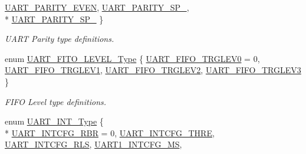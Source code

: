 \begin{DoxyCompactItemize}
\hyperlink{group___u_a_r_t___public___types_gga66fa9d836eb6f7035939427e6f8cc318ad908a637b1dd23f93b149dd2d8bdfdb8}{U\+A\+R\+T\+\_\+\+P\+A\+R\+I\+T\+Y\+\_\+\+E\+V\+EN}, 
\hyperlink{group___u_a_r_t___public___types_gga66fa9d836eb6f7035939427e6f8cc318ae9f804cb1d440a3a890fd7617450d2a1}{U\+A\+R\+T\+\_\+\+P\+A\+R\+I\+T\+Y\+\_\+\+S\+P\+\_}, 
\\*
\hyperlink{group___u_a_r_t___public___types_gga66fa9d836eb6f7035939427e6f8cc318a7b7ef44908952b2188985f07f81420f6}{U\+A\+R\+T\+\_\+\+P\+A\+R\+I\+T\+Y\+\_\+\+S\+P\+\_}
 \}\begin{DoxyCompactList}\small\item\em U\+A\+RT Parity type definitions. \end{DoxyCompactList}
\item 
enum \hyperlink{group___u_a_r_t___public___types_gad85d4333c1c346b3078d4abe95d4b2f7}{U\+A\+R\+T\+\_\+\+F\+I\+T\+O\+\_\+\+L\+E\+V\+E\+L\+\_\+\+Type} \{ \hyperlink{group___u_a_r_t___public___types_ggad85d4333c1c346b3078d4abe95d4b2f7a31c04a9c2880b330633c41a16014a9d5}{U\+A\+R\+T\+\_\+\+F\+I\+F\+O\+\_\+\+T\+R\+G\+L\+E\+V0} = 0, 
\hyperlink{group___u_a_r_t___public___types_ggad85d4333c1c346b3078d4abe95d4b2f7aea4c7e4f74b82f0bd9b442d8c1d03809}{U\+A\+R\+T\+\_\+\+F\+I\+F\+O\+\_\+\+T\+R\+G\+L\+E\+V1}, 
\hyperlink{group___u_a_r_t___public___types_ggad85d4333c1c346b3078d4abe95d4b2f7a365bdb7edeb70b948cd269807e564999}{U\+A\+R\+T\+\_\+\+F\+I\+F\+O\+\_\+\+T\+R\+G\+L\+E\+V2}, 
\hyperlink{group___u_a_r_t___public___types_ggad85d4333c1c346b3078d4abe95d4b2f7abbfb98226ee6b9a20b5b91ffc8d46f1a}{U\+A\+R\+T\+\_\+\+F\+I\+F\+O\+\_\+\+T\+R\+G\+L\+E\+V3}
 \}\begin{DoxyCompactList}\small\item\em F\+I\+FO Level type definitions. \end{DoxyCompactList}
\item 
enum \hyperlink{group___u_a_r_t___public___types_ga7ee4c5ddc0e165158d0d9f1f03e1b66c}{U\+A\+R\+T\+\_\+\+I\+N\+T\+\_\+\+Type} \{ \\*
\hyperlink{group___u_a_r_t___public___types_gga7ee4c5ddc0e165158d0d9f1f03e1b66cacc310a6b8547b644e07e769df4fde8fa}{U\+A\+R\+T\+\_\+\+I\+N\+T\+C\+F\+G\+\_\+\+R\+BR} = 0, 
\hyperlink{group___u_a_r_t___public___types_gga7ee4c5ddc0e165158d0d9f1f03e1b66ca67b291fd89766fa19cb89288b25af35b}{U\+A\+R\+T\+\_\+\+I\+N\+T\+C\+F\+G\+\_\+\+T\+H\+RE}, 
\hyperlink{group___u_a_r_t___public___types_gga7ee4c5ddc0e165158d0d9f1f03e1b66ca77a61936f15e2a4069cdf45d71b140c9}{U\+A\+R\+T\+\_\+\+I\+N\+T\+C\+F\+G\+\_\+\+R\+LS}, 
\hyperlink{group___u_a_r_t___public___types_gga7ee4c5ddc0e165158d0d9f1f03e1b66ca6e9edcb2e05e9dc886acd7f194a84ba3}{U\+A\+R\+T1\+\_\+\+I\+N\+T\+C\+F\+G\+\_\+\+MS}, 

\end{DoxyCompactItemize}
